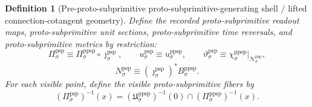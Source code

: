 \documentclass[11pt]{article}
\newcommand{\ProtoSubprimSpace}[1]{\mathcal N_{#1}^{\mathrm{psp}}}
\newcommand{\ProtoSubprimRead}[1]{\Pi_{#1}^{\mathrm{psp}}}
\newcommand{\ProtoSubprimUnit}[1]{u_{#1}^{\mathrm{psp}}}
\newcommand{\ProtoSubprimTimeRev}[1]{\vartheta_{#1}^{\mathrm{psp}}}
\newcommand{\ProtoSubprimMetric}[1]{N_{#1}^{\mathrm{psp}}}
\newcommand{\ProtoSubprimInc}[1]{\jmath_{#1}^{\mathrm{psp}}}
\newcommand{\PreProtoSubprimRead}[1]{\Pi_{#1}^{\mathrm{ppsp}}}
\newcommand{\PreProtoSubprimUnit}[1]{u_{#1}^{\mathrm{ppsp}}}
\newcommand{\PreProtoSubprimTimeRev}[1]{\chi_{#1}^{\mathrm{ppsp}}}
\newcommand{\PreProtoSubprimMetric}[1]{B_{#1}^{\mathrm{ppsp}}}
\newcommand{\PreProtoSubprimSection}[1]{\mathfrak U_{#1}^{\mathrm{ppsp}}}
\newtheorem{definition}{Definition}
\begin{document}
\begin{definition}[Pre-proto-subprimitive proto-subprimitive-generating shell / lifted connection-cotangent geometry]
Define the recorded proto-subprimitive readout maps, proto-subprimitive unit sections, proto-subprimitive time reversals, and proto-subprimitive metrics by restriction:
\begin{equation}
\ProtoSubprimRead{\sigma}\equiv \PreProtoSubprimRead{\sigma}\circ\ProtoSubprimInc{\sigma},
\qquad
\ProtoSubprimUnit{\sigma}\equiv \PreProtoSubprimUnit{\sigma},
\qquad
\ProtoSubprimTimeRev{\sigma}\equiv \PreProtoSubprimTimeRev{\sigma}|_{\ProtoSubprimSpace{\sigma}},
\label{eq:protosubprimitive_basic_structure_from_preprotosubprimitive}
\end{equation}
\begin{equation}
\ProtoSubprimMetric{\sigma}\equiv (\ProtoSubprimInc{\sigma})^*\PreProtoSubprimMetric{\sigma}.
\label{eq:protosubprimitive_metric_from_preprotosubprimitive}
\end{equation}
For each visible point, define the visible proto-subprimitive fibers by
\begin{equation}
(\ProtoSubprimRead{\sigma})^{-1}(x)
=
\left(\PreProtoSubprimSection{\sigma}\right)^{-1}(0)\cap(\PreProtoSubprimRead{\sigma})^{-1}(x).
\label{eq:protosubprimitive_fiber_from_preprotosubprimitive}
\end{equation}
\end{definition}
\end{document}
